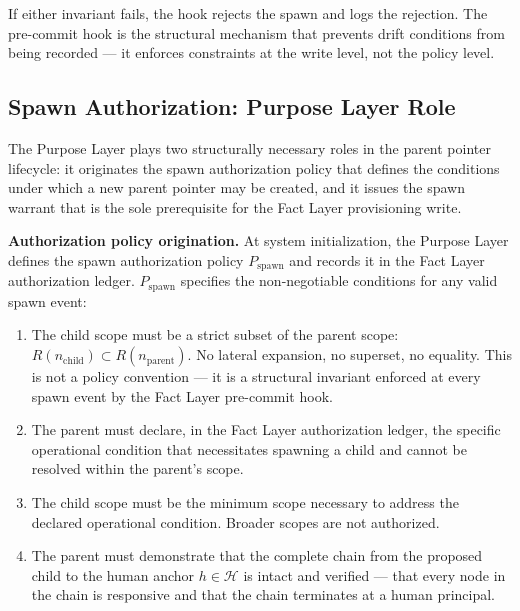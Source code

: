 If either invariant fails, the hook rejects the spawn and logs the rejection. The pre-commit hook is the structural mechanism that prevents drift conditions from being recorded — it enforces constraints at the write level, not the policy level.

\subsection{Spawn Authorization: Purpose Layer Role}
\label{sec:purpose-layer-authorization}

The Purpose Layer plays two structurally necessary roles in the parent pointer lifecycle: it originates the spawn authorization policy that defines the conditions under which a new parent pointer may be created, and it issues the spawn warrant that is the sole prerequisite for the Fact Layer provisioning write.

\medskip
\noindent\textbf{Authorization policy origination.} At system initialization, the Purpose Layer defines the spawn authorization policy $P_{\mathrm{spawn}}$ and records it in the Fact Layer authorization ledger. $P_{\mathrm{spawn}}$ specifies the non-negotiable conditions for any valid spawn event:

\begin{enumerate}
    \item[(S1) \textbf{Scope refinement}] The child scope must be a strict subset of the parent scope: $R(n_{\mathrm{child}}) \subset R(n_{\mathrm{parent}})$. No lateral expansion, no superset, no equality. This is not a policy convention — it is a structural invariant enforced at every spawn event by the Fact Layer pre-commit hook.

    \item[(S2) \textbf{Operational necessity}] The parent must declare, in the Fact Layer authorization ledger, the specific operational condition that necessitates spawning a child and cannot be resolved within the parent's scope.

    \item[(S3) \textbf{Minimum scope proportionality}] The child scope must be the minimum scope necessary to address the declared operational condition. Broader scopes are not authorized.

    \item[(S4) \textbf{Human root confirmation}] The parent must demonstrate that the complete chain from the proposed child to the human anchor $h \in \mathcal{H}$ is intact and verified — that every node in the chain is responsive and that the chain terminates at a human principal.
\end{enumerate}


